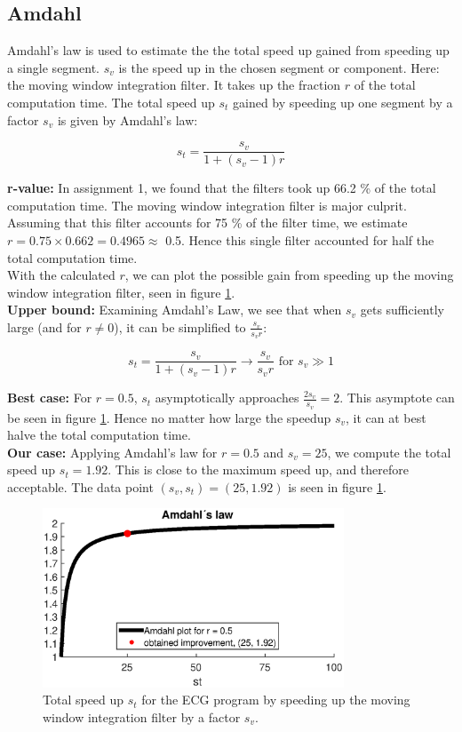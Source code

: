 
\subsection{Amdahl}
\label{sec:amdahl}

Amdahl's law is used to estimate the the total speed up gained from speeding up a single segment. $s_v$ is the speed up in the chosen segment or component. Here: the moving window integration filter. It takes up the fraction $r$ of the total computation time. The total speed up $s_t$ gained by speeding up one segment by a factor $s_v$ is given by Amdahl's law:

\begin{equation}
    s_t = \frac{s_v}{1+(s_v-1) r}
\end{equation}

\textbf{r-value:} In assignment 1, we found that the filters took up 66.2 \% of the total computation time. The moving window integration filter is major culprit. Assuming that this filter accounts for 75 \% of the filter time, we estimate $r = 0.75 \times 0.662 = 0.4965 \approx$ 0.5. Hence this single filter accounted for half the total computation time.\\

With the calculated $r$, we can plot the possible gain from speeding up the moving window integration filter, seen in figure \ref{fig:amdahl}.\\

\textbf{Upper bound:} Examining Amdahl's Law, we see that when $s_v$ gets sufficiently large (and for $r \ne 0$), it can be simplified to $\frac{s_v}{s_vr}$:

\begin{equation}
    s_t = \frac{s_v}{1+(s_v-1) r} \rightarrow \frac{s_v}{s_v r} \text{ for } s_v \gg 1
\end{equation}

\textbf{Best case:} For $r = 0.5$, $s_t$ asymptotically approaches $\frac{2s_v}{s_v} = 2$. This asymptote can be seen in figure \ref{fig:amdahl}. Hence no matter how large the speedup $s_v$, it can at best halve the total computation time. \\

\textbf{Our case:} Applying Amdahl's law for $r=0.5$ and $s_v = 25$, we compute the total speed up $s_t = 1.92$. This is close to the maximum speed up, and therefore acceptable. The data point $(s_v, s_t) = (25, 1.92)$ is seen in figure \ref{fig:amdahl}.

\begin{figure}[H]
    \centering
    \includegraphics[width=0.8\textwidth]{3Results/fig/Amdahl.eps}
    \caption{Total speed up $s_t$ for the ECG program by speeding up the moving window integration filter by a factor $s_v$.}
    \label{fig:amdahl}
\end{figure}
